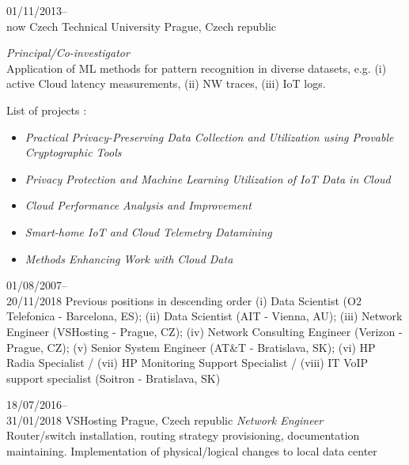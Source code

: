 \documentclass[]{friggeri-cv} %
\begin{document}
\begin{entrylist}
\entry
{01/11/2013--\\now}
{Czech Technical University}
{Prague, Czech republic}
{\emph{Principal/Co-investigator}\\
Application of ML methods for pattern recognition in diverse datasets, e.g. (i) active Cloud latency measurements, (ii) NW traces, (iii) IoT logs. 

List of projects :
\begin{itemize}
	\item \emph{Practical Privacy-Preserving Data Collection and Utilization using Provable Cryptographic Tools}
	\item \emph{Privacy Protection and Machine Learning Utilization of IoT Data in Cloud}
	\item \emph{Cloud Performance Analysis and Improvement}~\cite{tomanek2016multidimensional}
	\item \emph{Smart-home IoT and Cloud Telemetry Datamining}
	\item \emph{Methods Enhancing Work with Cloud Data}~\cite{mulinka2015learning}
\end{itemize}
}

\entry
{01/08/2007--\\20/11/2018}
{Previous positions}
{in descending order}
{(i) Data Scientist (O2 Telefonica - Barcelona, ES); (ii) Data Scientist (AIT - Vienna, AU); (iii) Network Engineer (VSHosting - Prague, CZ); (iv) Network Consulting Engineer (Verizon - Prague, CZ); (v) Senior System Engineer (AT\&T - Bratislava, SK); (vi) HP Radia Specialist / (vii) HP Monitoring Support Specialist / (viii) IT VoIP support specialist (Soitron - Bratislava, SK)}

\iffalse
\entry
{18/07/2016--\\31/01/2018}
{VSHosting}
{Prague, Czech republic}
{\emph{Network Engineer}\\
Router/switch installation, routing strategy provisioning, documentation maintaining. Implementation of physical/logical changes to local data center
}



\end{entrylist}
\end{document}
